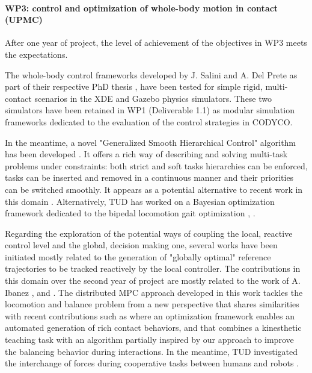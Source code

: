 

 
\paragraph*{WP3: control and optimization of whole-body motion in contact (UPMC)}

After one year of project, the level of achievement of the objectives in WP3 meets the expectations.

The whole-body control frameworks developed by J. Salini and A. Del Prete as part of their respective PhD thesis \cite{salini2012}, \cite{delprete2013} have been tested for simple rigid, multi-contact scenarios in the XDE \cite{XDE} and Gazebo \cite{Gazebo} physics simulators. These two simulators have been retained in WP1 (Deliverable 1.1) as modular simulation frameworks dedicated to the evaluation of the control strategies in CODYCO.

In the meantime, a novel "Generalized Smooth Hierarchical Control" algorithm has been developed \cite{liu2013}. It offers a rich way of describing and solving multi-task problems under constraints: both strict and soft tasks hierarchies can be enforced, tasks can be inserted and removed in a continuous manner and their priorities can be switched smoothly. It appears as a potential alternative to recent work in this domain \cite{escande2012}. Alternatively, TUD has worked on a Bayesian optimization framework dedicated to the bipedal locomotion gait optimization \cite{calandra2014}, \cite{calandra2014b}.

Regarding the exploration of the potential ways of coupling the local, reactive control level and the global, decision making one, several works have been initiated mostly related to the generation of "globally optimal" reference trajectories to be tracked reactively by the local controller. The contributions in this domain over the second year of project are mostly related to the work of A. Ibanez \cite{ibanez2013}, \cite{ibanez2014-icra} and \cite{ibanez2014-ark}. The distributed MPC approach developed in this work tackles the locomotion and balance problem from a new perspective that shares similarities with recent contributions such as \cite{mordatch2012} where an optimization framework enables an automated generation of rich contact behaviors, and \cite{ott2013} that combines a kinesthetic teaching task with an algorithm partially inspired by our approach to improve the balancing behavior during interactions. In the meantime, TUD investigated the interchange of forces during cooperative tasks between humans and robots \cite{berger2013}.




